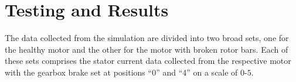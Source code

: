 \documentclass[conference]{IEEEtran}
\begin{document}
\section{Testing and Results}
The data collected from the simulation are divided into two broad sets, one for the healthy motor and the other for the motor with broken rotor bars. Each of these sets comprises the stator current data collected from the respective motor with the gearbox brake set at positions ``0'' and ``4'' on a scale of $0$-$5$.




%

%
\end{document}
